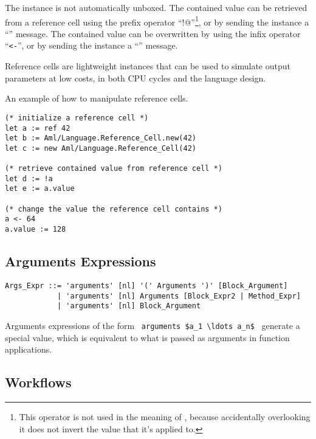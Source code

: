 The  instance is not automatically unboxed. The contained value can be retrieved from a reference cell using the prefix operator ``\lstinline@!@''\footnote{This operator is not used in the meaning of , because accidentally overlooking it does not invert the value that it's applied to.}, or by sending the instance a ``'' message. The contained value can be overwritten by using the infix operator ``\lstinline!<-!'', or by sending the instance a ``'' message. 

Reference cells are lightweight instances that can be used to simulate output parameters at low costs, in both CPU cycles and the language design.

\example An example of how to manipulate reference cells. 
\begin{lstlisting}
(* initialize a reference cell *)
let a := ref 42
let b := Aml/Language.Reference_Cell.new(42)
let c := new Aml/Language.Reference_Cell(42)

(* retrieve contained value from reference cell *)
let d := !a
let e := a.value

(* change the value the reference cell contains *)
a <- 64
a.value := 128
\end{lstlisting}





\subsection{Arguments Expressions}
\label{sec:arguments-expressions}

\syntax\begin{lstlisting}
Args_Expr ::= 'arguments' [nl] '(' Arguments ')' [Block_Argument]
            | 'arguments' [nl] Arguments [Block_Expr2 | Method_Expr]
            | 'arguments' [nl] Block_Argument
\end{lstlisting}

Arguments expressions of the form ~\lstinline!arguments $a_1 \ldots a_n$!~ generate a special value, which is equivalent to what is passed as arguments in function applications. %





\subsection{Workflows}
\label{sec:workflows}

